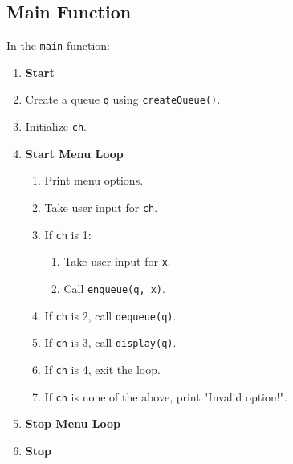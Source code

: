 {  \subsection{Main Function}
  In the \texttt{main} function:
  \begin{enumerate}[label=\arabic*:, start=1]
    \item \textbf{Start}
    \item Create a queue \texttt{q} using \texttt{createQueue()}.
    \item Initialize \texttt{ch}.
    \item \textbf{Start Menu Loop}
          \begin{enumerate}[label=4.\arabic*:, start=1]
            \item Print menu options.
            \item Take user input for \texttt{ch}.
            \item If \texttt{ch} is 1:
                  \begin{enumerate}[label=4.1.\arabic*:, start=1]
                    \item Take user input for \texttt{x}.
                    \item Call \texttt{enqueue(q, x)}.
                  \end{enumerate}
            \item If \texttt{ch} is 2, call \texttt{dequeue(q)}.
            \item If \texttt{ch} is 3, call \texttt{display(q)}.
            \item If \texttt{ch} is 4, exit the loop.
            \item If \texttt{ch} is none of the above, print "Invalid option!".
          \end{enumerate}
    \item \textbf{Stop Menu Loop}
    \item \textbf{Stop}
  \end{enumerate}
 }

